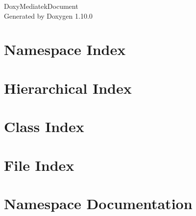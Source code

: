 \documentclass[twoside]{book}
\newcommand{\+}{\discretionary{\mbox{\scriptsize$\hookleftarrow$}}{}{}}
\newcommand{\clearemptydoublepage}{%
    \newpage{\pagestyle{empty}\cleardoublepage}%
  }
\begin{document}
  \raggedbottom
    \hypersetup{pageanchor=false,
                bookmarksnumbered=true,
                pdfencoding=unicode
               }
  \begin{titlepage}
  \vspace*{7cm}
  \begin{center}%
  {\Large Doxy\+Mediatek\+Document}\\
  \vspace*{1cm}
  {\large Generated by Doxygen 1.10.0}\\
  \end{center}
  \end{titlepage}
  \clearemptydoublepage
  \tableofcontents
  \clearemptydoublepage
  \hypersetup{pageanchor=true}
\chapter{Namespace Index}

\chapter{Hierarchical Index}

\chapter{Class Index}

\chapter{File Index}

\chapter{Namespace Documentation}








\end{document}
